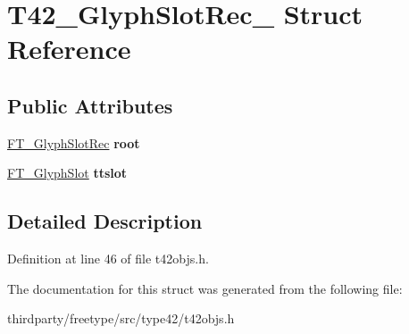 \hypertarget{struct_t42___glyph_slot_rec__}{}\section{T42\+\_\+\+Glyph\+Slot\+Rec\+\_\+ Struct Reference}
\label{struct_t42___glyph_slot_rec__}
\subsection*{Public Attributes}
\begin{DoxyCompactItemize}
\item 
\mbox{\label{struct_t42___glyph_slot_rec___a25b76478fe1455ec081c1045e53588da}} 
\hyperlink{struct_f_t___glyph_slot_rec__}{F\+T\+\_\+\+Glyph\+Slot\+Rec} {\bfseries root}
\item 
\mbox{\label{struct_t42___glyph_slot_rec___aadd69ee963adbc1124a5c79183cccda7}} 
\hyperlink{struct_f_t___glyph_slot_rec__}{F\+T\+\_\+\+Glyph\+Slot} {\bfseries ttslot}
\end{DoxyCompactItemize}


\subsection{Detailed Description}


Definition at line 46 of file t42objs.\+h.



The documentation for this struct was generated from the following file\+:\begin{DoxyCompactItemize}
\item 
thirdparty/freetype/src/type42/t42objs.\+h\end{DoxyCompactItemize}
